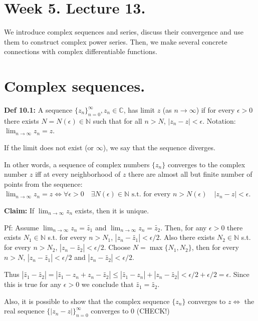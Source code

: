 \documentclass{article}
\begin{document}
\section*{Week 5. Lecture 13.}

We introduce complex sequences and series, discuss their convergence and use them to construct complex power series. Then, we make several concrete connections with complex differentiable functions.

\section{Complex sequences.}

\textbf{Def 10.1:} A sequence $\{z_n\}_{n=0}^{\infty}, z_n \in \mathbb{C}$, has limit $z$ (as $n \to \infty$) if for every $\epsilon > 0$ there exists $N = N(\epsilon) \in \mathbb{N}$ such that for all $n > N$, $|z_n - z| < \epsilon$. Notation: $\lim_{n \to \infty} z_n = z$.

If the limit does not exist (or $\infty$), we say that the sequence diverges.

In other words, a sequence of complex numbers $\{z_n\}$ converges to the complex number $z$ iff at every neighborhood of $z$ there are almost all but finite number of points from the sequence: $\lim_{n \to \infty} z_n = z \iff \forall \epsilon > 0 \quad \exists N(\epsilon) \in \mathbb{N} \text{ s.t. for every } n > N(\epsilon) \quad |z_n - z| < \epsilon$.

\textbf{Claim:} If $\lim_{n \to \infty} z_n$ exists, then it is unique.

Pf: Assume $\lim_{n \to \infty} z_n = \tilde{z_1}$ and $\lim_{n \to \infty} z_n = \tilde{z_2}$. Then, for any $\epsilon > 0$ there exists $N_1 \in \mathbb{N}$ s.t. for every $n > N_1$, $|z_n - \tilde{z_1}| < \epsilon/2$. Also there exists $N_2 \in \mathbb{N}$ s.t. for every $n > N_2$, $|z_n - \tilde{z_2}| < \epsilon/2$. Choose $N = \max\{N_1, N_2\}$, then for every $n > N$, $|z_n - \tilde{z_1}| < \epsilon/2$ and $|z_n - \tilde{z_2}| < \epsilon/2$.

Thus $|\tilde{z_1} - \tilde{z_2}| = |\tilde{z_1} - z_n + z_n - \tilde{z_2}| \leq |\tilde{z_1} - z_n| + |z_n - \tilde{z_2}| < \epsilon/2 + \epsilon/2 = \epsilon$. Since this is true for any $\epsilon > 0$ we conclude that $\tilde{z_1} = \tilde{z_2}$.

Also, it is possible to show that the complex sequence $\{z_n\}$ converges to $z \iff$ the real sequence $\{|z_n - z|\}_{n=0}^{\infty}$ converges to 0 (CHECK!)
\end{document}
